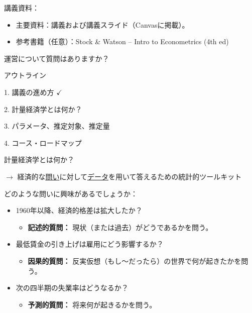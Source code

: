 \documentclass[11pt,handout]{beamer}
\begin{document}
\begin{frame}
	講義資料：
	
	\begin{itemize}
		\item 主要資料：講義および講義スライド（Canvasに掲載）。
		
		\item 参考書籍（任意）：Stock \& Watson -- Intro to Econometrics (4th ed)
\end{itemize}
\bigskip
運営について質問はありますか？

\end{frame}

\begin{frame}{アウトライン}

1. 講義の進め方 $\checkmark$
\vspace{0.8cm}

2. 計量経済学とは何か？
\vspace{0.8cm}

3. パラメータ、推定対象、推定量
\vspace{0.8cm}

4. コース・ロードマップ

\end{frame}

\begin{frame}{計量経済学とは何か？}

\vspace{0.2cm}
$\rightarrow$ 経済的な\uline{問い}に対して\uline{データ}を用いて答えるための統計的ツールキット
\bigskip 

どのような問いに興味があるでしょうか：
\pause
\medskip

\begin{itemize}
\item<1-> 1960年以降、経済的格差は拡大したか？
	\begin{itemize}
		\item<3-> \textbf{記述的質問：} 現状（または過去）がどうであるかを問う。
	\end{itemize}
\item<1-> 最低賃金の引き上げは雇用にどう影響するか？
	\begin{itemize}
		\item<4-> \textbf{因果的質問：} 反実仮想（もし〜だったら）の世界で何が起きたかを問う。
	\end{itemize}
\item<1-> 次の四半期の失業率はどうなるか？
	\begin{itemize}
	\item<5-> \textbf{予測的質問：} 将来何が起きるかを問う。
\end{itemize}

\end{itemize}
\medskip

\pause 
{}

\end{frame}
\end{document}
